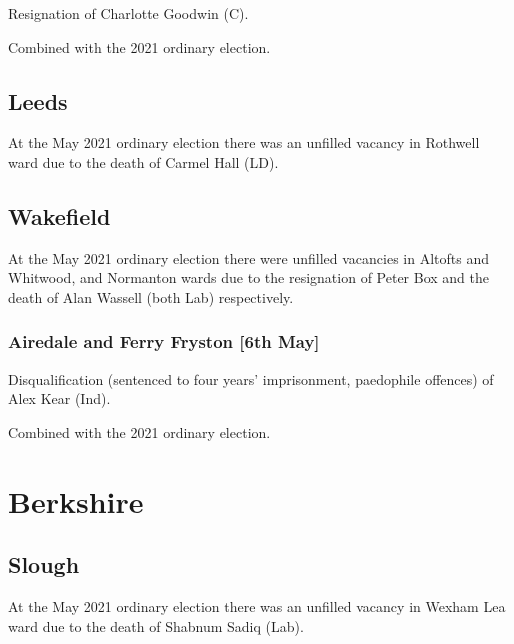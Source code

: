 \documentclass[a4paper,openany]{book}
\begin{document}
\begin{resultsiii}

Resignation of Charlotte Goodwin (C).

Combined with the 2021 ordinary election.

\subsection*{Leeds}

At the May 2021 ordinary election there was an unfilled vacancy in Rothwell ward due to the death of Carmel Hall (LD).

\subsection*{Wakefield}

At the May 2021 ordinary election there were unfilled vacancies in Altofts and Whitwood, and Normanton wards due to the resignation of Peter Box and the death of Alan Wassell (both Lab) respectively.

\subsubsection*{Airedale and Ferry Fryston \hspace*{\fill}\nolinebreak[1]%
	\enspace\hspace*{\fill}
	[6th May]}


Disqualification (sentenced to four years' imprisonment, paedophile offences) of Alex Kear (Ind).

Combined with the 2021 ordinary election.

\section{Berkshire}

\subsection*{Slough}

At the May 2021 ordinary election there was an unfilled vacancy in Wexham Lea ward due to the death of Shabnum Sadiq (Lab).


\end{resultsiii}
\end{document}
